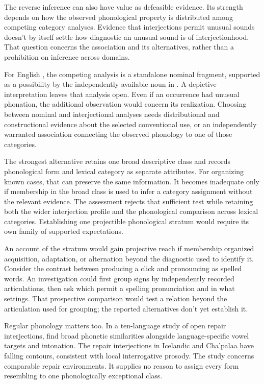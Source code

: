 \documentclass[12pt]{article}
\begin{document}
The reverse inference can also have value as defeasible evidence.
Its strength depends on how the observed phonological property is
distributed among competing category analyses. Evidence that interjections
permit unusual sounds doesn't by itself settle how diagnostic an unusual
sound is of interjectionhood. That question concerns the association
and its alternatives, rather than a prohibition on inference across domains.

For English , the competing analysis is a
standalone nominal fragment, supported as a possibility by the independently
available noun in . A depictive interpretation leaves
that analysis open. Even if an occurrence had unusual phonation, the
additional observation would concern its realization. Choosing between
nominal and interjectional analyses needs distributional and constructional
evidence about the selected conventional use, or an independently warranted
association connecting the observed phonology to one of those categories.

The strongest alternative retains one broad descriptive class and records
phonological form and lexical category as separate attributes. For organizing known cases,
that can preserve the same information. It becomes inadequate only if
membership in the broad class is used to infer a category assignment
without the relevant evidence. The assessment rejects
that sufficient test while retaining both the wider interjection profile
and the phonological comparison across lexical categories. Establishing one projectible
phonological stratum would require its own family of supported expectations.

An account of the stratum would gain projective reach if membership
organized acquisition, adaptation, or alternation beyond the diagnostic
used to identify it. Consider the contrast between producing a click
and pronouncing  as spelled words. An investigation
could first group signs by independently recorded articulations, then
ask which permit a spelling pronunciation and in what settings.
That prospective comparison would test a relation beyond the articulation
used for grouping; the reported alternatives don't yet establish it.

Regular phonology matters too. In a ten-language study of open repair
interjections, \textcite{dingemanse2013huh} find broad phonetic similarities
alongside language-specific vowel targets and intonation. The repair interjections in Icelandic and
Cha'palaa have falling contours, consistent with local interrogative
prosody. The study concerns comparable repair environments. It supplies
no reason to assign every form resembling  to one
phonologically exceptional class.
\end{document}
